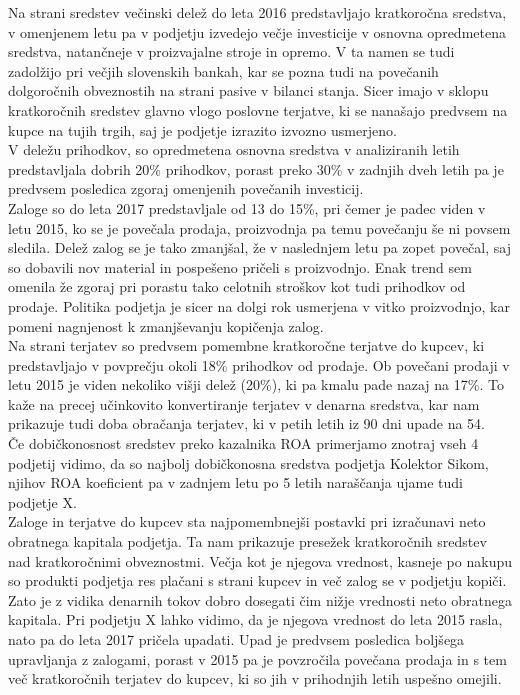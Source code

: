 \documentclass[12pt,a4paper]{amsart}
\theoremstyle{definition} %
\theoremstyle{plain} %
\begin{document}
Na strani sredstev večinski delež do leta 2016 predstavljajo kratkoročna sredstva, v omenjenem letu pa v podjetju izvedejo večje investicije v osnovna opredmetena sredstva, natančneje v proizvajalne stroje in opremo. V ta namen se tudi zadolžijo pri večjih slovenskih bankah, kar se pozna tudi na povečanih dolgoročnih obveznostih na strani pasive v bilanci stanja. Sicer imajo v sklopu kratkoročnih sredstev glavno vlogo poslovne terjatve, ki se nanašajo predvsem na kupce na tujih trgih, saj je podjetje izrazito izvozno usmerjeno. \\
V deležu prihodkov, so opredmetena osnovna sredstva v analiziranih letih predstavljala dobrih 20\% prihodkov, porast preko 30\% v zadnjih dveh letih pa je predvsem posledica zgoraj omenjenih povečanih investicij.\\
Zaloge so do leta 2017 predstavljale od 13 do 15\%, pri čemer je padec viden v letu 2015, ko se je povečala prodaja, proizvodnja pa temu povečanju še ni povsem sledila. Delež zalog se je tako zmanjšal, že v naslednjem letu pa zopet povečal, saj so dobavili nov material in pospešeno pričeli s proizvodnjo. Enak trend sem omenila že zgoraj pri porastu tako celotnih stroškov kot tudi prihodkov od prodaje. Politika podjetja je sicer na dolgi rok usmerjena v vitko proizvodnjo, kar pomeni nagnjenost k zmanjševanju kopičenja zalog.  \\
Na strani terjatev so predvsem pomembne kratkoročne terjatve do kupcev, ki predstavljajo v povprečju okoli 18\% prihodkov od prodaje. Ob povečani prodaji v letu 2015 je viden nekoliko višji delež (20\%), ki pa kmalu pade nazaj na 17\%. To kaže na precej učinkovito konvertiranje terjatev v denarna sredstva, kar nam prikazuje tudi doba obračanja terjatev, ki v petih letih iz 90 dni upade na 54. \\

Če dobičkonosnost sredstev preko kazalnika ROA primerjamo znotraj vseh 4 podjetij vidimo, da so najbolj dobičkonosna sredstva podjetja Kolektor Sikom, njihov ROA koeficient pa v zadnjem letu po 5 letih naraščanja ujame tudi podjetje X.\\

Zaloge in terjatve do kupcev sta najpomembnejši postavki pri izračunavi neto obratnega kapitala podjetja. Ta nam prikazuje presežek kratkoročnih sredstev nad kratkoročnimi obveznostmi. Večja kot je njegova vrednost, kasneje po nakupu so produkti podjetja res plačani s strani kupcev in več zalog se v podjetju kopiči. Zato je z vidika denarnih tokov dobro dosegati čim nižje vrednosti neto obratnega kapitala. Pri podjetju X lahko vidimo, da je njegova vrednost do leta 2015 rasla, nato pa do leta 2017 pričela upadati. Upad je predvsem posledica boljšega upravljanja z zalogami, porast v 2015 pa je povzročila povečana prodaja in s tem več kratkoročnih terjatev do kupcev, ki so jih v prihodnjih letih uspešno omejili.\\
\end{document}
